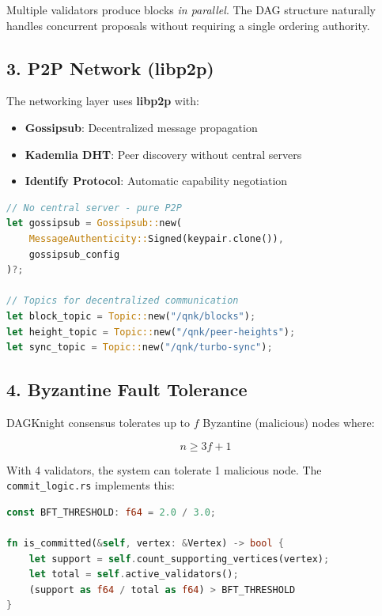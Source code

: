 \documentclass[a5paper,11pt]{article}
\begin{document}
Multiple validators produce blocks \textit{in parallel}. The DAG structure naturally handles concurrent proposals without requiring a single ordering authority.

\subsection{3. P2P Network (libp2p)}

The networking layer uses \textbf{libp2p} with:

\begin{itemize}
    \item \textbf{Gossipsub}: Decentralized message propagation
    \item \textbf{Kademlia DHT}: Peer discovery without central servers
    \item \textbf{Identify Protocol}: Automatic capability negotiation
\end{itemize}

\begin{lstlisting}[language=Rust, caption=unified\_network\_manager.rs]
// No central server - pure P2P
let gossipsub = Gossipsub::new(
    MessageAuthenticity::Signed(keypair.clone()),
    gossipsub_config
)?;

// Topics for decentralized communication
let block_topic = Topic::new("/qnk/blocks");
let height_topic = Topic::new("/qnk/peer-heights");
let sync_topic = Topic::new("/qnk/turbo-sync");
\end{lstlisting}

\subsection{4. Byzantine Fault Tolerance}

DAGKnight consensus tolerates up to $f$ Byzantine (malicious) nodes where:

\[ n \geq 3f + 1 \]

With 4 validators, the system can tolerate 1 malicious node. The \texttt{commit\_logic.rs} implements this:

\begin{lstlisting}[language=Rust, caption=commit\_logic.rs - BFT threshold]
const BFT_THRESHOLD: f64 = 2.0 / 3.0;

fn is_committed(&self, vertex: &Vertex) -> bool {
    let support = self.count_supporting_vertices(vertex);
    let total = self.active_validators();
    (support as f64 / total as f64) > BFT_THRESHOLD
}
\end{lstlisting}
\end{document}
